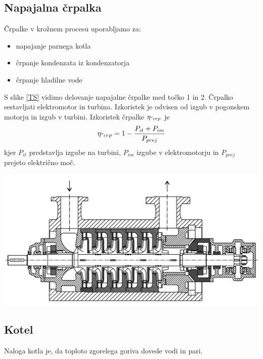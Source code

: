 \documentclass[a4paper,10pt]{article}
\begin{document}
\begin{multicols}{2}
\subsection{Napajalna črpalka}
Črpalke v krožnem procesu uporabljamo za:
\begin{itemize}
	\item napajanje parnega kotla
	\item črpanje kondenzata iz kondenzatorja
	\item črpanje hladilne vode
\end{itemize}		
S slike \ref{TS} vidimo delovanje napajalne črpalke med točko 1 in 2. Črpalko sestavljati elektromotor in turbina. Izkoristek je odvisen od izgub v pogonskem motorju in izgub v turbini.
Izkoristek črpalke $\eta_{"crp}$  je
\begin{equation}
	\eta_{"crp}=1-\frac{P_{it}+P_{im}}{P_{prej}}
\end{equation}
kjer $P_{it}$ predstavlja izgube na turbini, $P_{im}$ izgube v elektromotorju in $P_{prej}$ prejeto električno moč.
\begin{minipage}{\linewidth}
\includegraphics[width=0.95\columnwidth]{Kotlovska_crpalka.png}
\label{crp}
\end{minipage}
\subsection{Kotel}
Naloga kotla je, da toploto zgorelega goriva dovede vodi in pari.


\end{multicols}
\end{document}
